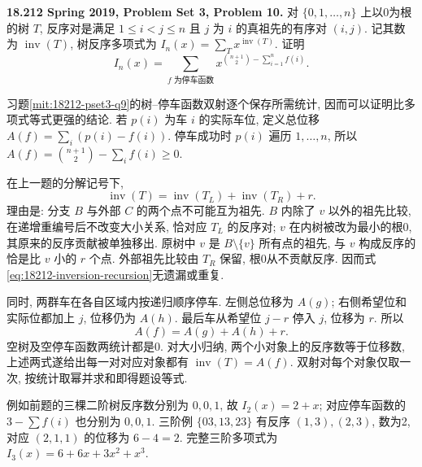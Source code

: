 \begin{exercise}\label{mit:18212-pset3-q10}
\textbf{18.212 Spring 2019, Problem Set 3, Problem 10.}
对 $\{0,1,\ldots,n\}$ 上以0为根的树 $T$, 反序对是满足 $1\le i<j\le n$ 且 $j$ 为 $i$ 的真祖先的有序对 $(i,j)$. 记其数为 $\operatorname{inv}(T)$, 树反序多项式为
$I_n(x)=\sum_T x^{\operatorname{inv}(T)}$. 证明
\[
 I_n(x)=\sum_{f\text{ 为停车函数}}
             x^{\binom{n+1}2-\sum_{i=1}^n f(i)}.
\]
\end{exercise}
\begin{solution}
习题\ref{mit:18212-pset3-q9}的树--停车函数双射逐个保存所需统计, 因而可以证明比多项式等式更强的结论. 若 $p(i)$ 为车 $i$ 的实际车位, 定义总位移
$A(f)=\sum_i(p(i)-f(i))$. 停车成功时 $p(i)$ 遍历 $1,\ldots,n$, 所以
$A(f)=\binom{n+1}2-\sum_i f(i)\ge0$.

在上一题的分解记号下,
\begin{equation}\label{eq:18212-inversion-recursion}
 \operatorname{inv}(T)=\operatorname{inv}(T_L)+\operatorname{inv}(T_R)+r.
\end{equation}
理由是: 分支 $B$ 与外部 $C$ 的两个点不可能互为祖先. $B$ 内除了 $v$ 以外的祖先比较, 在递增重编号后不改变大小关系, 恰对应 $T_L$ 的反序对; $v$ 在内树被改为最小的根0, 其原来的反序贡献被单独移出. 原树中 $v$ 是 $B\setminus\{v\}$ 所有点的祖先, 与 $v$ 构成反序的恰是比 $v$ 小的 $r$ 个点. 外部祖先比较由 $T_R$ 保留, 根0从不贡献反序. 因而式\eqref{eq:18212-inversion-recursion}无遗漏或重复.

同时, 两群车在各自区域内按递归顺序停车. 左侧总位移为 $A(g)$; 右侧希望位和实际位都加上 $j$, 位移仍为 $A(h)$. 最后车从希望位 $j-r$ 停入 $j$, 位移为 $r$. 所以
\[
 A(f)=A(g)+A(h)+r.
\]
空树及空停车函数两统计都是0. 对大小归纳, 两个小对象上的反序数等于位移数, 上述两式遂给出每一对对应对象都有 $\operatorname{inv}(T)=A(f)$. 双射对每个对象仅取一次, 按统计取幂并求和即得题设等式.

例如前题的三棵二阶树反序数分别为 $0,0,1$, 故 $I_2(x)=2+x$; 对应停车函数的 $3-\sum f(i)$ 也分别为 $0,0,1$. 三阶例 $\{03,13,23\}$ 有反序 $(1,3),(2,3)$, 数为2, 对应 $(2,1,1)$ 的位移为 $6-4=2$. 完整三阶多项式为 $I_3(x)=6+6x+3x^2+x^3$.
\end{solution}

